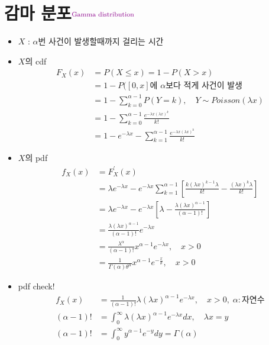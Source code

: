 \documentclass{oblivoir}
\newcommand{\DC}[1]{\textcolor{DarkMagenta}{#1}}%
\newcommand{\UP}[1]{$^{\mbox{\DC{\footnotesize #1}}}$}
\begin{document}
\section{감마 분포\UP{Gamma distribution}}
\begin{itemize}
\item $X$ : $\alpha$번 사건이 발생할때까지 걸리는 시간
\item $X$의 cdf
\begin{align*}
F_X(x) &= P(X \leq x) = 1 - P(X > x) \\
&= 1 - P([0,x] \mbox{에 $\alpha$보다 적게 사건이 발생} \\
&= 1 - \sum_{k=0}^{\alpha-1} P(Y=k), \quad Y \sim Poisson(\lambda x) \\
&= 1 - \sum_{k=0}^{\alpha-1} \frac{e^{-\lambda x (\lambda x)^k}}{k!} \\
&= 1 - e^{-\lambda x} -  \sum_{k=1}^{\alpha -1} \frac{e^{-\lambda x (\lambda x)^k}}{k!}
\end{align*}
\item $X$의 pdf
\begin{align*}
f_X(x) &= F_X^{\prime} (x) \\
&= \lambda e^{-\lambda x} - e^{-\lambda x} \sum_{k=1}^{\alpha-1} \left[\frac{k(\lambda x)^{k-1} \lambda}{k!} - \frac{(\lambda x)^k \lambda}{k!} \right] \\
&= \lambda e^{-\lambda x} - e^{-\lambda x} \left[\lambda - \frac{\lambda (\lambda x)^{\alpha -1}}{(\alpha -1)!}  \right] \\
&= \frac{\lambda (\lambda x)^{\alpha -1}}{(\alpha -1)!} e^{-\lambda x} \\
&= \frac{\lambda^{\alpha}}{(\alpha - 1)!} x^{\alpha - 1} e^{- \lambda x}, \quad x > 0 \\
&= \frac{1}{\Gamma(\alpha) \theta^{\alpha}} x^{\alpha - 1} e^{- \frac{x}{\theta}}, \quad x > 0
\end{align*}
\item pdf check!
\begin{align*}
f_X(x) &= \frac{1}{(\alpha - 1)!} \lambda (\lambda x)^{\alpha - 1} e^{- \lambda x}, \quad x > 0,\; \alpha : \mbox{자연수}\\
(\alpha -  1)! &= \int_0^{\infty} \lambda (\lambda x)^{\alpha - 1} e^{- \lambda x} dx, \quad \lambda x = y \\
(\alpha -  1)! &= \int_0^{\infty} y^{\alpha - 1} e^{- y} dy = \Gamma(\alpha)
\end{align*}


\end{itemize}
\end{document}
